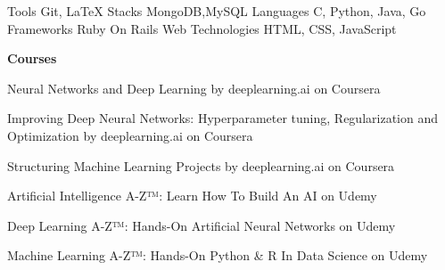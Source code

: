 



  \begin{cvskills}
  \cvskill
    {Tools}
    {Git, LaTeX} 
  \cvskill
    {Stacks}
    {MongoDB,MySQL}
  \cvskill
      {Languages}
      {C, Python, Java, Go}
  \cvskill
    {Frameworks}
    {Ruby On Rails}
  \cvskill
    {Web Technologies}
    {HTML, CSS, JavaScript}
    

  \end{cvskills}


  \begin{cventries}

 \cventry
 {\bf Courses}
 {}
 {}
 {}
    {
      \begin{cvitems} %
        \item {Neural Networks and Deep Learning by deeplearning.ai on Coursera}
        \item {Improving Deep Neural Networks: Hyperparameter tuning, Regularization and Optimization by deeplearning.ai on Coursera}
        \item {Structuring Machine Learning Projects by deeplearning.ai on Coursera}
        \item {Artificial Intelligence A-Z™: Learn How To Build An AI on Udemy}
        \item {Deep Learning A-Z™: Hands-On Artificial Neural Networks on Udemy}
        \item {Machine Learning A-Z™: Hands-On Python & R In Data Science on Udemy}
      \end{cvitems}
    }
\end{cventries}